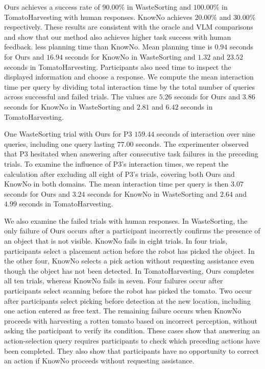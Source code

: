Ours achieves a success rate of $90.00\%$ in WasteSorting and $100.00\%$ in TomatoHarvesting with human responses. KnowNo achieves $20.00\%$ and $30.00\%$ respectively. These results are consistent with the oracle and VLM comparisons and show that our method also achieves higher task success with human feedback.  less planning time than KnowNo. Mean planning time is $0.94$ seconds for Ours and $16.94$ seconds for KnowNo in WasteSorting and $1.32$ and $23.52$ seconds in TomatoHarvesting. Participants also need time to inspect the displayed information and choose a response. We compute the mean interaction time per query by dividing total interaction time by the total number of queries across successful and failed trials. The values are $5.26$ seconds for Ours and $3.86$ seconds for KnowNo in WasteSorting and $2.81$ and $6.42$ seconds in TomatoHarvesting.

One WasteSorting trial with Ours for P3  $159.44$ seconds of interaction over nine queries, including one query lasting $77.00$ seconds. The experimenter observed that P3 hesitated when answering after consecutive task failures in the preceding trials. To examine the influence of P3's interaction times, we repeat the calculation after excluding all eight of P3's trials, covering both Ours and KnowNo in both domains. The mean interaction time per query is then $3.07$ seconds for Ours and $3.24$ seconds for KnowNo in WasteSorting and $2.64$ and $4.99$ seconds in TomatoHarvesting.



We also examine the failed trials with human responses. In WasteSorting, the only failure of Ours occurs after a participant incorrectly confirms the presence of an object that is not visible. KnowNo fails in eight trials. In four trials, participants select a placement action before the robot has picked the object. In the other four, KnowNo selects a pick action without requesting assistance even though the object has not been detected. In TomatoHarvesting, Ours completes all ten trials, whereas KnowNo fails in seven. Four failures occur after participants select scanning before the robot has picked the tomato. Two occur after participants select picking before detection at the new location, including one action entered as free text. The remaining failure occurs when KnowNo proceeds with harvesting a rotten tomato based on incorrect perception, without asking the participant to verify its condition. These cases show that answering an action-selection query requires participants to check which preceding actions have been completed. They also show that participants have no opportunity to correct an action if KnowNo proceeds without requesting assistance. 




